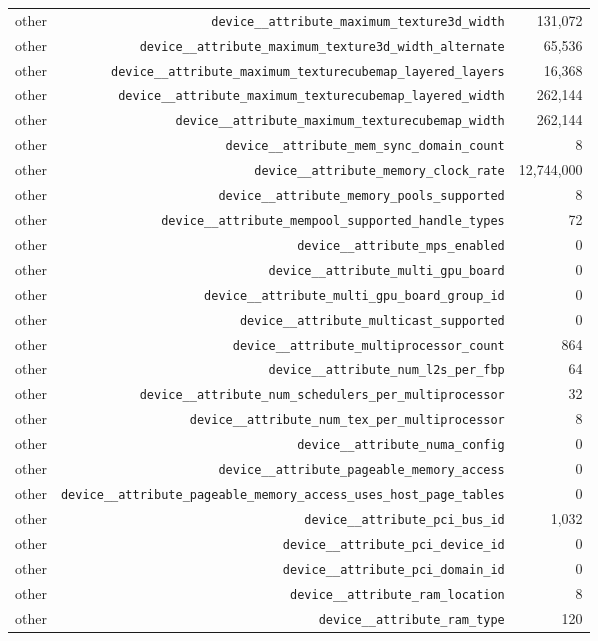\begin{table}[h]
\begin{tabular}{|l|r|r|}
other & \texttt{device__attribute_maximum_texture3d_width} & 131,072 \\
other & \texttt{device__attribute_maximum_texture3d_width_alternate} & 65,536 \\
other & \texttt{device__attribute_maximum_texturecubemap_layered_layers} & 16,368 \\
other & \texttt{device__attribute_maximum_texturecubemap_layered_width} & 262,144 \\
other & \texttt{device__attribute_maximum_texturecubemap_width} & 262,144 \\
other & \texttt{device__attribute_mem_sync_domain_count} & 8 \\
other & \texttt{device__attribute_memory_clock_rate} & 12,744,000 \\
other & \texttt{device__attribute_memory_pools_supported} & 8 \\
other & \texttt{device__attribute_mempool_supported_handle_types} & 72 \\
other & \texttt{device__attribute_mps_enabled} & 0 \\
other & \texttt{device__attribute_multi_gpu_board} & 0 \\
other & \texttt{device__attribute_multi_gpu_board_group_id} & 0 \\
other & \texttt{device__attribute_multicast_supported} & 0 \\
other & \texttt{device__attribute_multiprocessor_count} & 864 \\
other & \texttt{device__attribute_num_l2s_per_fbp} & 64 \\
other & \texttt{device__attribute_num_schedulers_per_multiprocessor} & 32 \\
other & \texttt{device__attribute_num_tex_per_multiprocessor} & 8 \\
other & \texttt{device__attribute_numa_config} & 0 \\
other & \texttt{device__attribute_pageable_memory_access} & 0 \\
other & \texttt{device__attribute_pageable_memory_access_uses_host_page_tables} & 0 \\
other & \texttt{device__attribute_pci_bus_id} & 1,032 \\
other & \texttt{device__attribute_pci_device_id} & 0 \\
other & \texttt{device__attribute_pci_domain_id} & 0 \\
other & \texttt{device__attribute_ram_location} & 8 \\
other & \texttt{device__attribute_ram_type} & 120 \\

\end{tabular}
\end{table}
